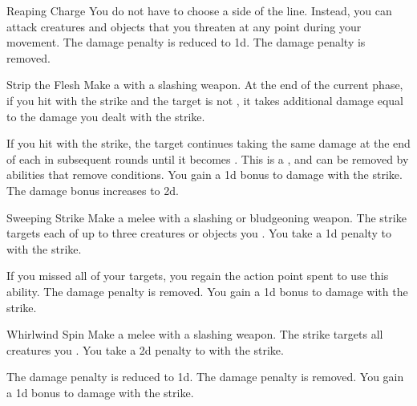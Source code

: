 {\begin{ability}{Reaping Charge}
                \rankline
                 You do not have to choose a side of the line.
                Instead, you can attack creatures and objects that you threaten at any point during your movement.
                 The damage penalty is reduced to \minus1d.
                 The damage penalty is removed.
            \end{ability}

            \begin{ability}{Strip the Flesh}
                Make a  with a slashing weapon.
                At the end of the current phase, if you hit with the strike and the target is not , it takes additional damage equal to the damage you dealt with the strike.

                \rankline
                 If you hit with the strike, the target continues taking the same damage at the end of each  in subsequent rounds until it becomes .
                This is a , and can be removed by abilities that remove conditions.
                 You gain a \plus1d bonus to damage with the strike.
                 The damage bonus increases to \plus2d.
            \end{ability}

            \begin{ability}{Sweeping Strike}
                Make a melee  with a slashing or bludgeoning weapon.
                The strike targets each of up to three creatures or objects you .
                You take a \minus1d penalty to  with the strike.

                \rankline
                 If you missed all of your targets, you regain the action point spent to use this ability.
                 The damage penalty is removed.
                 You gain a \plus1d bonus to damage with the strike.
            \end{ability}

            \begin{ability}{Whirlwind Spin}
                Make a melee  with a slashing weapon.
                The strike targets all creatures you .
                You take a \minus2d penalty to  with the strike.

                \rankline
                 The damage penalty is reduced to \minus1d.
                 The damage penalty is removed.
                 You gain a \plus1d bonus to damage with the strike.
            \end{ability}
        }

